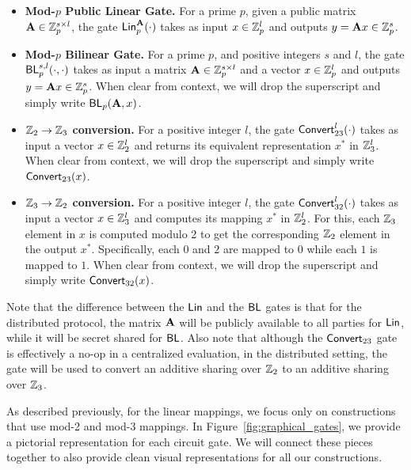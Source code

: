 \begin{itemize}
    \item \textbf{Mod-$p$ Public Linear Gate.}
    For a prime $p$, given a public matrix $\mat{A} \in \Z_p^{s \times l}$, the gate $\LMap^\mat{A}_p(\cdot)$ takes as input $x \in \mathbb{Z}_p^l$ and outputs $y = \mat{A}x \in \Z_p^s$.

    \item \textbf{Mod-$p$ Bilinear Gate.}
    For a prime $p$, and positive integers $s$ and $l$, the gate $\textsf{BL}_p^{s,l}(\cdot, \cdot)$ takes as input a matrix $\mat{A} \in \Z_p^{s \times l}$ and a vector $x \in \mathbb{Z}_p^l$ and outputs $y = \mat{A}x \in \Z_p^s$. When clear from context, we will drop the superscript and simply write $\BLMap_p(\mat{A}, x)$.
    
    \item \textbf{$\mathbb{Z}_2 \to \mathbb{Z}_3$ conversion.} For a positive integer $l$, the gate $\textsf{Convert}^l_{23}(\cdot)$ takes as input a vector $x \in \mathbb{Z}_2^l$ and returns its equivalent representation $x^*$ in $\mathbb{Z}_3^l$. When clear from context, we will drop the superscript and simply write $\textsf{Convert}_{23}(x)$.

    \item \textbf{$\mathbb{Z}_3 \to \mathbb{Z}_2$ conversion.} For a positive integer $l$, the gate $\textsf{Convert}^l_{32}(\cdot)$ takes as input a vector $x \in \mathbb{Z}_3^l$ and computes its mapping $x^*$ in $\mathbb{Z}_2^l$. For this, each $\mathbb{Z}_3$ element in $x$ is computed modulo 2 to get the corresponding $\mathbb{Z}_2$ element in the output $x^*$. Specifically, each $0$ and $2$ are mapped to $0$ while each $1$ is mapped to $1$. When clear from context, we will drop the superscript and simply write $\textsf{Convert}_{32}(x)$.
\end{itemize}

\noindent Note that the difference between the $\textsf{Lin}$ and the $\textsf{BL}$ gates is that for the distributed protocol, the matrix $\mat{A}$ will be publicly available to all parties for $\textsf{Lin}$, while it will be secret shared for $\textsf{BL}$. Also note that although the $\textsf{Convert}_{23}$ gate is effectively a no-op in a centralized evaluation, in the distributed setting, the gate will be used to convert an additive sharing over $\mathbb{Z}_2$ to an additive sharing over $\mathbb{Z}_3$.

As described previously, for the linear mappings, we focus only on constructions that use mod-2 and mod-3 mappings. In Figure~\ref{fig:graphical_gates}, we provide a pictorial representation for each circuit gate. We will connect these pieces together to also provide clean visual representations for all our constructions. 

